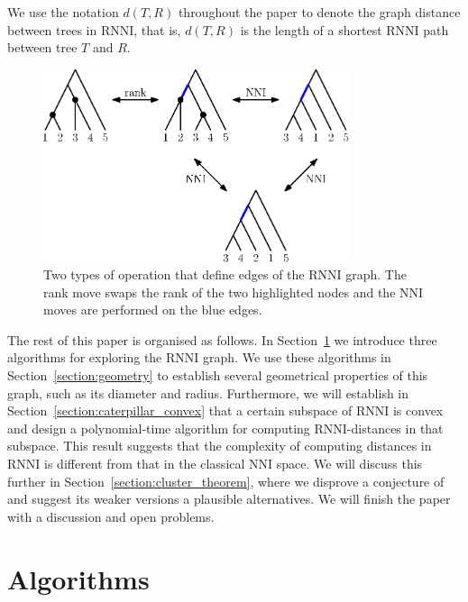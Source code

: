 \documentclass{amsart}
\newcommand{\nni}{\mathrm{NNI}}
\newcommand{\rnni}{\mathrm{RNNI}}
\begin{document}
We use the notation $d(T, R)$ throughout the paper to denote the graph distance between trees in $\rnni$, that is, $d(T, R)$ is the length of a shortest $\rnni$ path between tree $T$ and $R$.

\begin{figure}[H]
\centering
\includegraphics[width=0.8\textwidth]{RNNI}
\vspace{12pt}
\caption{Two types of operation that define edges of the $\rnni$ graph.
The rank move swaps the rank of the two highlighted nodes and the $\nni$ moves are performed on the blue edges.}
\label{fig:RNNI}
\end{figure}

The rest of this paper is organised as follows.
In Section~\ref{section:algorithms} we introduce three algorithms for exploring the $\rnni$ graph.
We use these algorithms in Section~\ref{section:geometry} to establish several geometrical properties of this graph, such as its diameter and radius.
Furthermore, we will establish in Section~\ref{section:caterpillar_convex} that a certain subspace of $\rnni$ is convex and design a polynomial-time algorithm for computing $\rnni$-distances in that subspace.
This result suggests that the complexity of computing distances in $\rnni$ is different from that in the classical $\nni$ space.
We will discuss this further in Section~\ref{section:cluster_theorem}, where we disprove a conjecture of \textcite{Gavryushkin2018-ol} and suggest its weaker versions a plausible alternatives.
We will finish the paper with a discussion and open problems.


\section{Algorithms}
\label{section:algorithms}
\end{document}
